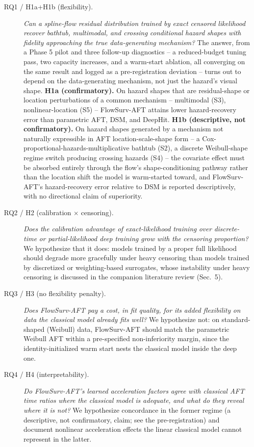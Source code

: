 \documentclass[11pt]{article}
\begin{document}
\begin{description}
  \item[RQ1 / H1a+H1b (flexibility).] \emph{Can a spline-flow residual
    distribution trained by exact censored likelihood recover bathtub,
    multimodal, and crossing conditional hazard shapes with fidelity
    approaching the true data-generating mechanism?} The answer, from a
    Phase 5 pilot and three follow-up diagnostics -- a reduced-budget
    tuning pass, two capacity increases, and a warm-start ablation, all
    converging on the same result and logged as a pre-registration
    deviation -- turns out to depend on the data-generating mechanism,
    not just the hazard's visual shape. \textbf{H1a
    (confirmatory).} On hazard shapes that are residual-shape or
    location perturbations of a common mechanism -- multimodal (S3),
    nonlinear-location (S5) -- FlowSurv-AFT attains lower hazard-recovery
    error than parametric AFT, DSM, and DeepHit. \textbf{H1b
    (descriptive, not confirmatory).} On hazard shapes generated by a
    mechanism not naturally expressible in AFT location-scale-shape form
    -- a Cox-proportional-hazards-multiplicative bathtub (S2), a discrete
    Weibull-shape regime switch producing crossing hazards (S4) -- the
    covariate effect must be absorbed entirely through the flow's
    shape-conditioning pathway rather than the location shift the model
    is warm-started toward, and FlowSurv-AFT's hazard-recovery error
    relative to DSM is reported descriptively, with no directional claim
    of superiority.
  \item[RQ2 / H2 (calibration $\times$ censoring).] \emph{Does the
    calibration advantage of exact-likelihood training over
    discrete-time or partial-likelihood deep training grow with the
    censoring proportion?} We hypothesize that it does: models trained
    by a proper full likelihood should degrade more gracefully under
    heavy censoring than models trained by discretized or
    weighting-based surrogates, whose instability under heavy censoring
    is discussed in the companion literature review (Sec.~5).
  \item[RQ3 / H3 (no flexibility penalty).] \emph{Does FlowSurv-AFT pay
    a cost, in fit quality, for its added flexibility on data the
    classical model already fits well?} We hypothesize not: on
    standard-shaped (Weibull) data, FlowSurv-AFT should match the
    parametric Weibull AFT within a pre-specified non-inferiority
    margin, since the identity-initialized warm start nests the
    classical model inside the deep one.
  \item[RQ4 / H4 (interpretability).] \emph{Do FlowSurv-AFT's learned
    acceleration factors agree with classical AFT time ratios where the
    classical model is adequate, and what do they reveal where it is
    not?} We hypothesize concordance in the former regime (a
    descriptive, not confirmatory, claim; see the pre-registration) and
    document nonlinear acceleration effects the linear classical model
    cannot represent in the latter.
\end{description}
\end{document}
